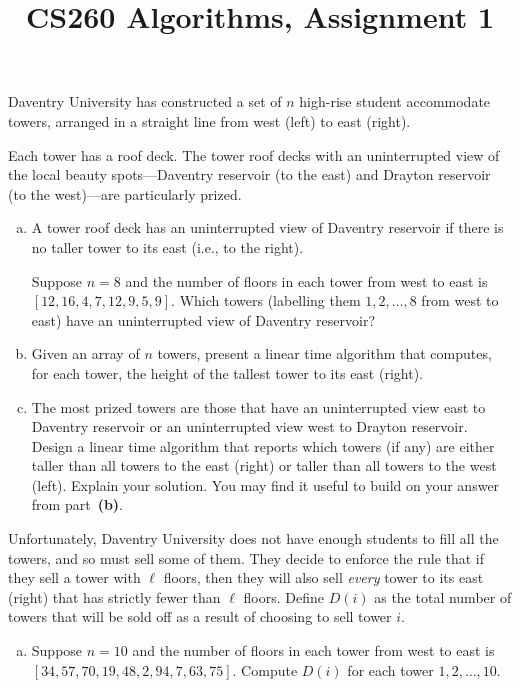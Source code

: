 \documentclass[a4paper]{article}
\title{CS260 Algorithms, Assignment 1}
\begin{document}
\maketitle

\setlength{\parindent}{0em}
\setlength{\parskip}{1em}



\begin{questionbody}
Daventry University has constructed a set of $n$ high-rise student accommodate towers, arranged in a straight line from west (left) to east (right).

Each tower has a roof deck. The tower roof decks with an uninterrupted view of the local beauty spots---Daventry reservoir (to the east) and Drayton reservoir (to the west)---are particularly prized.
\begin{enumerate}[(a)]
\item A tower roof deck has an uninterrupted view of Daventry reservoir if there is no taller tower to its east (i.e., to the right).

Suppose $n=8$ and the number of floors in each tower from west to east is $[12, 16, 4, 7, 12, 9, 5, 9]$. Which towers (labelling them $1, 2, \dotsc, 8$ from west to east) have an uninterrupted view of Daventry reservoir?

\item Given an array of $n$ towers, present a linear time algorithm that computes, for each tower, the height of the tallest tower to its east (right).

\item The most prized towers are those that have an uninterrupted view east to Daventry reservoir or an uninterrupted view west to Drayton reservoir. Design a linear time algorithm that reports which towers (if any) are either taller than all towers to the east (right) or taller than all towers to the west (left). Explain your solution. You may find it useful to build on your answer from part~\textbf{(b)}.
\end{enumerate}

Unfortunately, Daventry University does not have enough students to fill all the towers, and so must sell some of them. They decide to enforce the rule that if they sell a tower with $\ell$ floors, then they will also sell \textit{every} tower to its east (right) that has strictly fewer than $\ell$ floors. Define $D(i)$ as the total number of towers that will be sold off as a result of choosing to sell tower $i$.
\begin{enumerate}[(a), start=4]
\item Suppose $n=10$ and the number of floors in each tower from west to east is $[34, 57, 70, 19, 48, 2, 94, 7, 63, 75]$. Compute $D(i)$ for each tower $1, 2, \dotsc, 10$.


\end{enumerate}
\end{questionbody}
\end{document}
